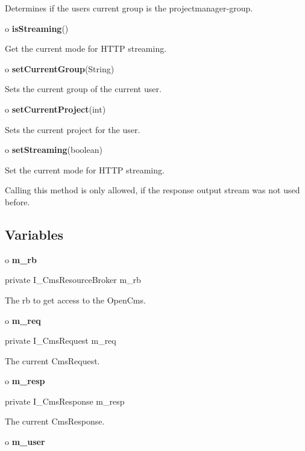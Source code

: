 \begin{description}
Determines if the users current group is the projectmanager-group.  
\item o {\bf isStreaming}()  

Get the current mode for HTTP streaming.  
\item o {\bf setCurrentGroup}(String)  

Sets the current group of the current user.  
\item o {\bf setCurrentProject}(int)  

Sets the current project for the user.  
\item o {\bf setStreaming}(boolean)  

Set the current mode for HTTP streaming.

Calling this method is only allowed, if the response output stream was not
used before. 
\end{description}

\subsection*{  Variables }

o {\bf m\_rb} 

\begin{PRE}
 private I\_CmsResourceBroker m\_rb
\end{PRE}

\begin{description}
\htmlDD The rb to get access to the OpenCms.

\end{description}

o {\bf m\_req} 

\begin{PRE}
 private I\_CmsRequest m\_req
\end{PRE}

\begin{description}
\htmlDD The current CmsRequest.

\end{description}

o {\bf m\_resp} 

\begin{PRE}
 private I\_CmsResponse m\_resp
\end{PRE}

\begin{description}
\htmlDD The current CmsResponse.

\end{description}

o {\bf m\_user} 

